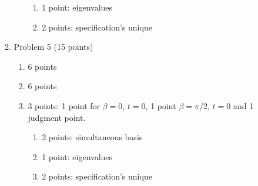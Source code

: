 \documentclass{article}
\begin{document}
\begin{enumerate}
\begin{enumerate}
\begin{enumerate}
\begin{enumerate}
                     \item 1 point: eigenvalues
                     \item 2 points: specification's unique
                  \end{enumerate}
            \end{enumerate}
         \item Problem 5 (15 points)
            \begin{enumerate}
               \item 6 points
               \item 6 points
               \item 3 points: 1 point for $ \beta = 0 $, $ t=0 $, 1 point $ \beta=
                  \pi/2 $, $ t=0 $ and 1 judgment point.
                  \begin{enumerate}
                     \item 2 points: simultaneous basis
                     \item 1 point: eigenvalues
                     \item 2 points: specification's unique
                  \end{enumerate}
            \end{enumerate}
      \end{enumerate}
\end{enumerate}
\end{document}
